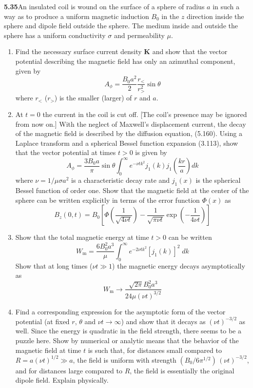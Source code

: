 \par\bigskip
\noindent\textbf{5.35}\quad An insulated coil is wound on the surface of a sphere of radius $a$ in such a way as to produce a uniform magnetic induction $B_{0}$ in the $z$ direction inside the sphere and dipole field outside the sphere. The medium inside and outside the sphere has a uniform conductivity $\sigma$ and permeability $\mu$.
\begin{enumerate}
\item[(a)] Find the necessary surface current density $\mathbf{K}$ and show that the vector potential describing the magnetic field has only an azimuthal component, given by
\[
A_{\phi}=\frac{B_{0}a^{2}}{2}\frac{r_{<}}{r_{>}^{2}}\sin\theta
\]
where $r_{<}$ ($r_{>}$) is the smaller (larger) of $r$ and $a$.
\item[(b)] At $t=0$ the current in the coil is cut off. [The coil's presence may be ignored from now on.] With the neglect of Maxwell's displacement current, the decay of the magnetic field is described by the diffusion equation, (5.160). Using a Laplace transform and a spherical Bessel function expansion (3.113), show that the vector potential at times $t>0$ is given by
\[
A_{\phi}=\frac{3B_{0}a}{\pi}\sin\theta\int_{0}^{\infty}e^{-\nu tk^{2}}j_{1}(k)j_{1}\!\left(\frac{kr}{a}\right)dk
\]
where $\nu=1/\mu\sigma a^{2}$ is a characteristic decay rate and $j_{1}(x)$ is the spherical Bessel function of order one. Show that the magnetic field at the center of the sphere can be written explicitly in terms of the error function $\Phi(x)$ as
\[
B_{z}(0,t)=B_{0}\!\left[\Phi\!\left(\frac{1}{\sqrt{4\nu t}}\right)-\frac{1}{\sqrt{\pi\nu t}}\exp\!\left(-\frac{1}{4\nu t}\right)\right]
\]
\item[(c)] Show that the total magnetic energy at time $t>0$ can be written
\[
W_{\mathrm{m}}=\frac{6B_{0}^{2}a^{3}}{\mu}\int_{0}^{\infty}e^{-2\nu tk^{2}}[j_{1}(k)]^{2}\;dk
\]
Show that at long times ($\nu t\gg1$) the magnetic energy decays asymptotically as
\[
W_{\mathrm{m}}\to\frac{\sqrt{2\pi}B_{0}^{2}a^{3}}{24\mu(\nu t)^{3/2}}
\]
\item[(d)] Find a corresponding expression for the asymptotic form of the vector potential (at fixed $r$, $\theta$ and $\nu t\to\infty$) and show that it decays as $(\nu t)^{-3/2}$ as well. Since the energy is quadratic in the field strength, there seems to be a puzzle here. Show by numerical or analytic means that the behavior of the magnetic field at time $t$ is such that, for distances small compared to $R=a(\nu t)^{1/2}\gg a$, the field is uniform with strength $(B_{0}/6\pi^{1/2})\,(\nu t)^{-3/2}$, and for distances large compared to $R$, the field is essentially the original dipole field. Explain physically.
\end{enumerate}
